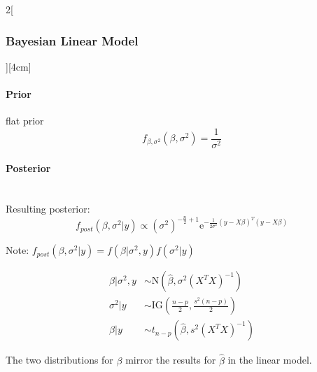 \documentclass[8pt]{extarticle}
\begin{document}
\begin{multicols}{2}[\subsubsection{Bayesian Linear Model}][4cm]

\paragraph{Prior} flat prior\ \\

$$f_{\beta,\sigma^2} (\beta,\sigma^2) = \frac{1}{\sigma^2}$$

\paragraph{Posterior} \ \\

\noindent Resulting posterior: $$f_{post}(\beta,\sigma^2|y)\propto (\sigma^2)^{-\frac{n}{2}+1} \mathrm{e}^{-\frac{1}{2\sigma^2} (y{-}X\beta)^T(y{-}X\beta)}$$

Note: $f_{post}(\beta,\sigma^2|y) = f(\beta|\sigma^2,y)f(\sigma^2|y)$



\begin{align*}
\beta|\sigma^2,y &\sim \mathrm{N}\left(\hat{\beta}, \sigma^2(X^TX)^{-1}\right)\\
\sigma^2|y &\sim \mathrm{IG}\left(\frac{n-p}{2},\frac{s^2(n-p)}{2}\right)\\
\beta|y &\sim t_{n-p}\left(\hat{\beta}, s^2(X^TX)^{-1}\right)
\end{align*}
\vspace{1em}

\noindent The two distributions for $\beta$ mirror the results for $\hat{\beta}$ in the linear model. 

\end{multicols} 
\end{document}
